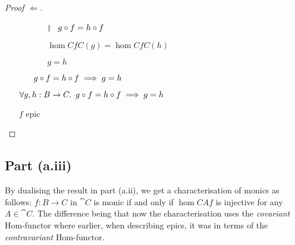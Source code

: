 \begin{prop}
\begin{proof}[Proof $\Leftarrow$]
\begin{itemize}
\begin{itemize}
          \item[\phs]
            \begin{itemize}
            \item[$\dagger$]
              \Ass~$g\circ f = h\circ f$
              \marginnote{\Hyp}

            \item[\iffs] $\hom{C}{f}{C}(g) = \hom{C}{f}{C}(h)$
              \marginnote{\Def-\ref{def:contra-hom}}

            \item[\imps] $g = h$
            \end{itemize}

          \item[\imps] $g\circ f = h\circ f \implies g = h$
            \marginnote{\imps-\Intro-$\dagger$}
        \end{itemize}
      \item[\imps] $\forall g, h : B \to C\ldotp~g\circ f = h\circ f \implies g = h$
        \marginnote{$\forall$-\Intro-$\star$}

      \item[\iffs] $f$ epic
        \qedhere
    \end{itemize}
  \end{proof}
\end{prop}

\subsection{Part (a.iii)}\label{sec:q-1-a-iii}
By dualising the result in part (a.ii), we get a characterisation of monics as follows: $f : B\to C$ in $\cat{C}$ is monic if and only if $\hom{C}{A}{f}$ is injective for any $A\in\cat{C}$. The difference being that now the characterisation uses the \textit{covariant} Hom-functor where earlier, when describing epics, it was in terms of the \textit{contravariant} Hom-functor.

